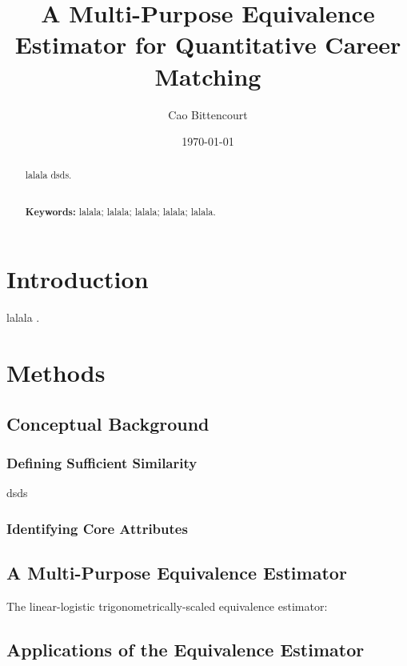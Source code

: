 \documentclass{article}
\title{
    A Multi-Purpose Equivalence Estimator for Quantitative Career Matching
}
\author{Cao Bittencourt}
\date{\today}
\begin{document}
\maketitle

\newpage
\begin{abstract}
    \noindent
    lalala dsds.

    \noindent
    \\ \textbf{Keywords:} lalala; lalala; lalala; lalala; lalala.
\end{abstract}

\newpage
\tableofcontents

\newpage
\listoftables

\newpage
\listoffigures

\newpage
\section{Introduction}
lalala \parencite[]{lalala}.

\section{Methods}
\subsection{Conceptual Background}
\subsubsection{Defining Sufficient Similarity}
dsds \parencite{dsds}

\subsubsection{Identifying Core Attributes}

\subsection{A Multi-Purpose Equivalence Estimator}
The linear-logistic trigonometrically-scaled equivalence estimator:
\EquivalenceEstimator

\subsection{Applications of the Equivalence Estimator}
\end{document}
